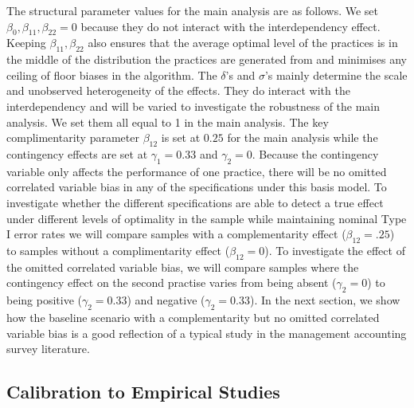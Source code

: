 \documentclass[12pt]{article}
\begin{document}
The structural parameter values for the main analysis are as follows. We set $\beta_0, \beta_{11}, \beta_{22} = 0$ because they do not interact with the interdependency effect. Keeping $\beta_{11}, \beta_{22}$ also ensures that the average optimal level of the practices is in the middle of the distribution the practices are generated from and minimises any ceiling of floor biases in the algorithm.  The $\delta$'s and $\sigma$'s mainly determine the scale and unobserved heterogeneity of the effects. They do interact with the interdependency and will be varied to investigate the robustness of the main analysis. We set them all equal to 1 in the main analysis. The key complimentarity parameter $\beta_{12}$ is set at $0.25$ for the main analysis while the contingency effects are set at $\gamma_1 = 0.33$ and $\gamma_2 = 0$. Because the contingency variable only affects the performance of one practice, there will be no omitted correlated variable bias in any of the specifications under this basis model. To investigate whether the different specifications are able to detect a true effect under different levels of optimality in the sample while maintaining nominal Type I error rates we will compare samples with a complementarity effect ($\beta_{12} = .25$) to samples without a complimentarity effect ($\beta_{12} = 0$). To investigate the effect of the omitted correlated variable bias, we will compare samples where the contingency effect on the second practise varies from being absent ($\gamma_2 = 0$) to being positive ($\gamma_2 = 0.33$) and negative ($\gamma_2 = 0.33$).  In the next section, we show how the baseline scenario with a complementarity but no omitted correlated variable bias is a good reflection of a typical study in the management accounting survey literature.

\subsection{Calibration to Empirical Studies}\label{optimality}
\end{document}
